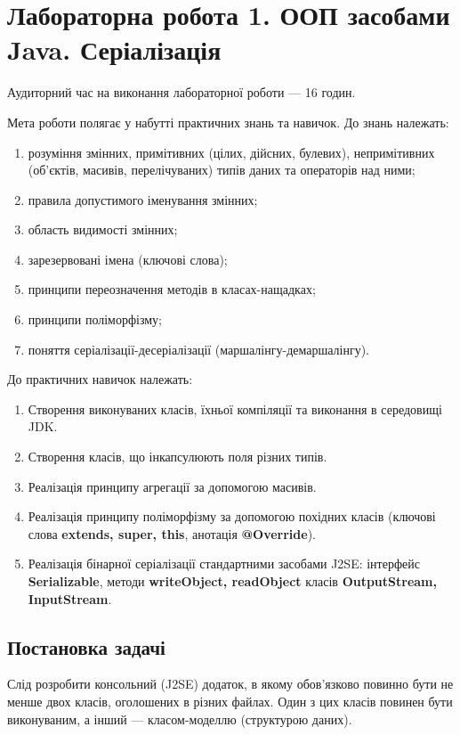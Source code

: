 \section{Лабораторна робота 1. ООП засобами Java. Серіалізація}
 

Аудиторний час на виконання лабораторної роботи --- 16 годин.

Мета роботи полягає у набутті практичних знань та навичок. 
До знань належать:
\begin{enumerate}
\item розуміння змінних, примітивних (цілих, дійсних, булевих), непримітивних (об’єктів, масивів, перелічуваних) типів даних та операторів над ними;
\item правила допустимого іменування змінних;
\item область видимості змінних;
\item зарезервовані імена (ключові слова); 
\item принципи переозначення методів в класах-нащадках;
\item принципи поліморфізму;
\item поняття серіалізації-десеріалізації (маршалінгу-демаршалінгу).
\end{enumerate}

До практичних навичок належать:
\begin{enumerate}
\item Створення виконуваних класів, їхньої компіляції та виконання в середовищі JDK.
\item Створення класів, що інкапсулюють поля різних типів.
\item Реалізація принципу агрегації за допомогою масивів.
\item Реалізація принципу поліморфізму за допомогою похідних класів (ключові слова {\bf extends, super, this}, анотація {\bf @Override}).
\item Реалізація бінарної серіалізації стандартними засобами J2SE: інтерфейс {\bf Serializable}, методи {\bf writeObject, readObject} класів {\bf OutputStream, InputStream}. 
\end{enumerate}

\subsection{Постановка задачі}
Слід розробити консольний (J2SE) додаток, в якому обов’язково повинно бути не менше двох класів, оголошених в різних файлах. Один з цих класів повинен бути виконуваним, а інший --- класом-моделлю (структурою даних).

